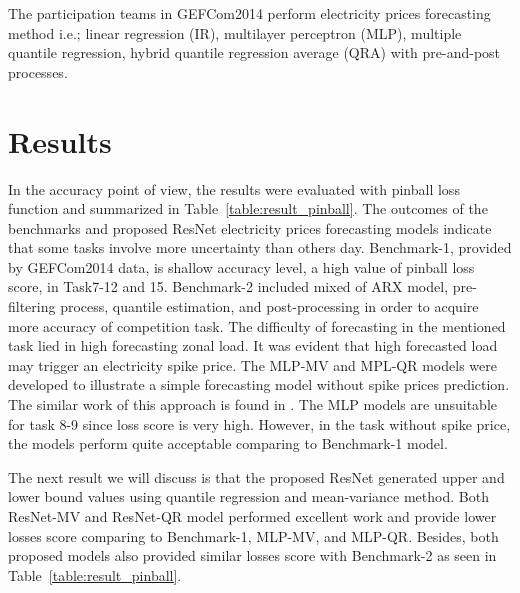 \documentclass[review]{elsarticle}
\begin{document}
      The participation teams in GEFCom2014 perform electricity prices forecasting method i.e.; linear regression (IR)\cite{Dudek2016}, multilayer perceptron (MLP)\cite{Dudek2016},  multiple quantile regression\cite{Juban2016}, hybrid quantile regression average (QRA) with pre-and-post processes\cite{Maciejowska2016}.

  \section{Results}
    In the accuracy point of view, the results were evaluated with pinball loss function and summarized in Table~\ref{table:result_pinball}.
    The outcomes of the benchmarks and proposed ResNet electricity prices forecasting models indicate that some tasks involve more uncertainty than others day.
    Benchmark-1, provided by GEFCom2014 data, is shallow accuracy level, a high value of pinball loss score, in Task7-12 and 15.
    Benchmark-2 included mixed of ARX model, pre-filtering process, quantile estimation, and post-processing in order to acquire more accuracy of competition task.
    The difficulty of forecasting in the mentioned task lied in high forecasting zonal load.
    It was evident that high forecasted load may trigger an electricity spike price.
    The MLP-MV and MPL-QR models were developed to illustrate a simple forecasting model without spike prices prediction.
    The similar work of this approach is found in \cite{Dudek2016}.
    The MLP models are unsuitable for task 8-9 since loss score is very high.
    However, in the task without spike price, the models perform quite acceptable comparing to Benchmark-1 model.

    The next result we will discuss is that the proposed ResNet generated upper and lower bound values using quantile regression and mean-variance method.
    Both ResNet-MV and ResNet-QR model performed excellent work and provide lower losses score comparing to Benchmark-1, MLP-MV, and MLP-QR.
    Besides, both proposed models also provided similar losses score with Benchmark-2 \cite{Maciejowska2016} as seen in Table~\ref{table:result_pinball}.
\end{document}
